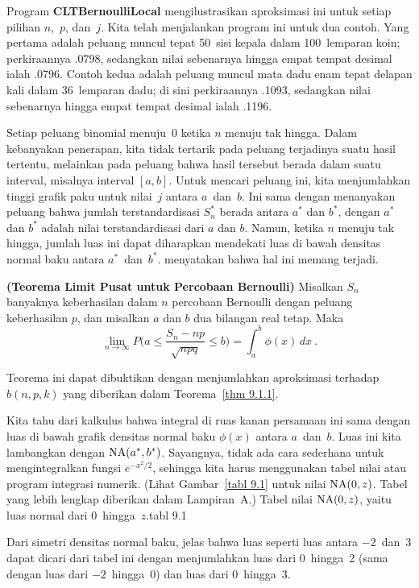 Program {\bf CLTBernoulliLocal} mengilustrasikan
aproksimasi ini untuk setiap pilihan $n$,~$p$, dan~$j$.  Kita telah menjalankan program ini untuk dua
contoh.  Yang pertama adalah peluang muncul tepat 50~sisi kepala dalam 100~lemparan koin;
perkiraannya .0798, sedangkan nilai sebenarnya hingga empat tempat desimal ialah .0796.  Contoh
kedua adalah peluang muncul mata dadu enam tepat delapan kali dalam 36~lemparan dadu; di sini perkiraannya
.1093, sedangkan nilai sebenarnya hingga empat tempat desimal ialah .1196.
\par
Setiap peluang binomial menuju~0 ketika $n$ menuju tak hingga.  Dalam
kebanyakan penerapan, kita tidak tertarik pada peluang terjadinya suatu hasil
tertentu, melainkan pada peluang bahwa hasil tersebut berada dalam suatu
interval, misalnya interval $[a, b]$.  Untuk mencari peluang ini, kita menjumlahkan
tinggi grafik paku untuk nilai~$j$ antara $a$~dan~$b$.  Ini sama dengan
menanyakan peluang bahwa jumlah terstandardisasi $S_n^*$ berada antara $a^*$ dan 
$b^*$, dengan $a^*$ dan $b^*$ adalah nilai terstandardisasi dari $a$ dan $b$.  Namun, ketika $n$
menuju tak hingga, jumlah luas ini dapat diharapkan mendekati luas
di bawah densitas normal baku antara $a^*$~dan~$b^*$.  
menyatakan bahwa hal ini memang terjadi.

\begin{theorem}{\bf (Teorema Limit Pusat untuk Percobaan Bernoulli)} 
Misalkan $S_n$ banyaknya keberhasilan dalam $n$ percobaan Bernoulli dengan peluang keberhasilan $p$, dan misalkan
$a$ dan $b$ dua bilangan real tetap.  Maka
$$\lim_{n \rightarrow \infty} P\biggl(a \le \frac{S_n - np}{\sqrt{npq}} \le b\biggr) = \int_a^b \phi(x)\,dx\ .$$
\end{theorem}

Teorema ini dapat dibuktikan dengan menjumlahkan aproksimasi terhadap $b(n,p,k)$ yang diberikan dalam 
Teorema~\ref{thm 9.1.1}.
\par
Kita tahu dari kalkulus bahwa integral di ruas kanan persamaan ini
sama dengan luas di bawah grafik densitas normal baku $\phi(x)$ antara
$a$~dan~$b$.  Luas ini kita lambangkan dengan ${\rm NA}(a^*, b^*)$.  Sayangnya, tidak ada cara sederhana untuk
mengintegralkan fungsi
$e^{-x^2/2}$, sehingga kita harus menggunakan tabel nilai atau program
integrasi numerik.  (Lihat Gambar~\ref{tabl 9.1} untuk nilai ${\rm NA}(0, z)$.  Tabel yang lebih lengkap 
diberikan dalam Lampiran~A.)
{Tabel nilai ${\rm NA}(0,z)$, yaitu luas normal dari 0~hingga~$z$.}{tabl 9.1}
\par
Dari simetri densitas normal baku, jelas bahwa luas seperti luas
antara $-2$~dan~3 dapat dicari dari tabel ini dengan menjumlahkan luas dari 0~hingga~2
(sama dengan luas dari $-2$~hingga~0) dan luas dari 0~hingga~3.
\par

